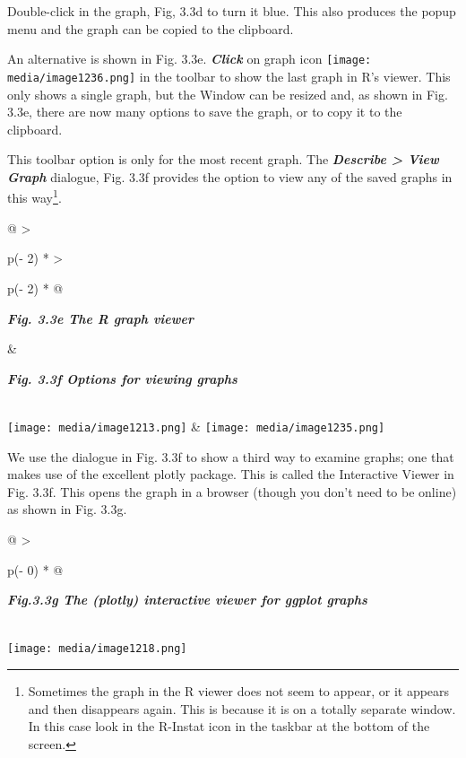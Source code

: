 \documentclass[
  letterpaper,
  DIV=11,
  numbers=noendperiod]{scrreprt}
\begin{document}
Double-click in the graph, Fig, 3.3d to turn it blue. This also produces
the popup menu and the graph can be copied to the clipboard.

An alternative is shown in Fig. 3.3e. \textbf{\emph{Click}} on graph
icon
\texttt{[image: media/image1236.png]}
in the toolbar to show the last graph in R's viewer. This only shows a
single graph, but the Window can be resized and, as shown in Fig. 3.3e,
there are now many options to save the graph, or to copy it to the
clipboard.

This toolbar option is only for the most recent graph. The
\textbf{\emph{Describe \textgreater{} View Graph}} dialogue, Fig. 3.3f
provides the option to view any of the saved graphs in this
way\footnote{Sometimes the graph in the R viewer does not seem to
  appear, or it appears and then disappears again. This is because it is
  on a totally separate window. In this case look in the R-Instat icon
  in the taskbar at the bottom of the screen.}.

\begin{longtable}[]{@{}
  >{\raggedright\arraybackslash}p{(\columnwidth - 2\tabcolsep) * }
  >{\raggedright\arraybackslash}p{(\columnwidth - 2\tabcolsep) * }@{}}
\toprule\noalign{}
\begin{minipage}[b]{\linewidth}\raggedright
\textbf{\emph{Fig. 3.3e The R graph viewer}}
\end{minipage} & \begin{minipage}[b]{\linewidth}\raggedright
\textbf{\emph{Fig. 3.3f Options for viewing graphs}}
\end{minipage} \\
\midrule\noalign{}
\endhead
\bottomrule\noalign{}
\endlastfoot
\texttt{[image: media/image1213.png]} &
\texttt{[image: media/image1235.png]} \\
\end{longtable}

We use the dialogue in Fig. 3.3f to show a third way to examine graphs;
one that makes use of the excellent plotly package. This is called the
Interactive Viewer in Fig. 3.3f. This opens the graph in a browser
(though you don't need to be online) as shown in Fig. 3.3g.

\begin{longtable}[]{@{}
  >{\raggedright\arraybackslash}p{(\columnwidth - 0\tabcolsep) * }@{}}
\toprule\noalign{}
\begin{minipage}[b]{\linewidth}\raggedright
\textbf{\emph{Fig.3.3g The (plotly) interactive viewer for ggplot
graphs}}
\end{minipage} \\
\midrule\noalign{}
\endhead
\bottomrule\noalign{}
\endlastfoot
\texttt{[image: media/image1218.png]} \\
\end{longtable}
\end{document}

